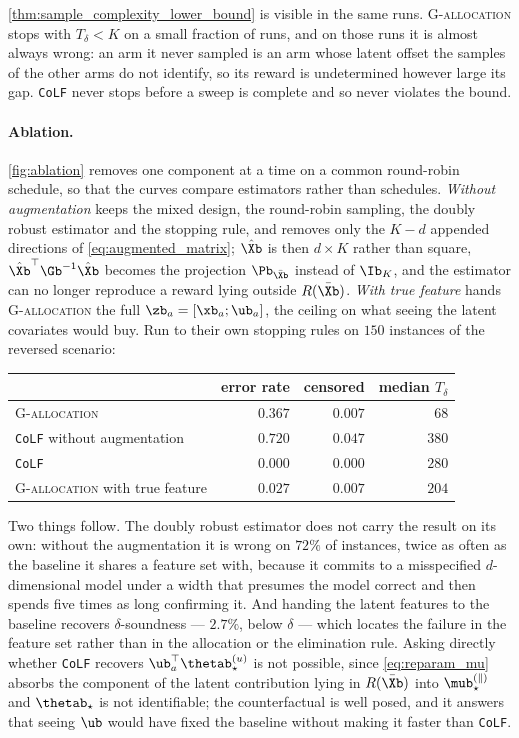 \cref{thm:sample_complexity_lower_bound} is visible in the same runs.  \textsc{G-allocation} stops with
$T_\delta<K$ on a small fraction of runs, and on those runs it is almost always
wrong: an arm it never sampled is an arm whose latent offset the samples of the
other arms do not identify, so its reward is undetermined however large its
gap.  \texttt{CoLF} never stops before a sweep is complete and so never
violates the bound.

\paragraph{Ablation.}
\cref{fig:ablation} removes one component at a time on a common round-robin
schedule, so that the curves compare estimators rather than schedules.
\emph{Without augmentation} keeps the mixed design, the round-robin sampling,
the doubly robust estimator and the stopping rule, and removes only the $K-d$
appended directions of \cref{eq:augmented_matrix}; $\hat\Xb$ is then $d\times K$
rather than square, $\hat\Xb^\top\Gb^{-1}\hat\Xb$ becomes the projection
$\Pb_{\bar\Xb}$ instead of $\Ib_K$, and the estimator can no longer reproduce a
reward lying outside $R(\bar\Xb)$.  \emph{With true feature} hands
\textsc{G-allocation} the full $\zb_a=[\xb_a;\ub_a]$, the ceiling on what
seeing the latent covariates would buy.  Run to their own stopping rules on
$150$ instances of the reversed scenario:

\begin{center}
\begin{tabular}{lrrr}
  \toprule
  & error rate & censored & median $T_\delta$\\
  \midrule
  \textsc{G-allocation}                      & $0.367$ & $0.007$ & $68$\\
  \texttt{CoLF} without augmentation         & $0.720$ & $0.047$ & $380$\\
  \texttt{CoLF}                              & $0.000$ & $0.000$ & $280$\\
  \textsc{G-allocation} with true feature    & $0.027$ & $0.007$ & $204$\\
  \bottomrule
\end{tabular}
\end{center}

Two things follow.  The doubly robust estimator does not carry the result on
its own: without the augmentation it is wrong on $72\%$ of instances, twice as
often as the baseline it shares a feature set with, because it commits to a
misspecified $d$-dimensional model under a width that presumes the model
correct and then spends five times as long confirming it.  And handing the
latent features to the baseline recovers $\delta$-soundness --- $2.7\%$, below
$\delta$ --- which locates the failure in the feature set rather than in the
allocation or the elimination rule.  Asking directly whether \texttt{CoLF}
recovers $\ub_a^\top\thetab_\star^{(u)}$ is not possible, since
\cref{eq:reparam_mu} absorbs the component of the latent contribution lying in
$R(\bar\Xb)$ into $\mub_\star^{(\parallel)}$ and $\thetab_\star$ is not
identifiable; the counterfactual is well posed, and it answers that seeing
$\ub$ would have fixed the baseline without making it faster than
\texttt{CoLF}.

